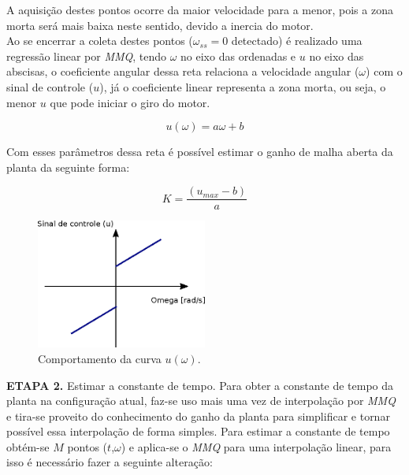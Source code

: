 
A aquisição destes pontos ocorre da maior velocidade para a menor, pois a zona morta será mais baixa neste sentido, devido a inercia do motor.\\

Ao se encerrar a coleta destes pontos ($\omega_{ss} = 0$ detectado) é realizado uma regressão linear por \textit{MMQ}, tendo $\omega$ no eixo das ordenadas e $u$ no eixo das abscisas, o coeficiente angular dessa reta relaciona a velocidade angular ($\omega$) com o sinal de controle ($u$), já o coeficiente linear representa a zona morta, ou seja, o menor $u$ que pode iniciar o giro do motor.

\begin{equation*}
    u(\omega) = a\omega + b
\end{equation*}

Com esses parâmetros dessa reta é possível estimar o ganho de malha aberta da planta da seguinte forma:

\begin{equation*}
    K = \frac{(u_{max} - b)}{a}
\end{equation*}
    
\begin{figure}[H]
    \centering
    \includegraphics[width=0.5\textwidth]{figuras/ilustracoes/omega_x_sinal_controle.eps}
    \caption{Comportamento da curva $u(\omega)$.}
    \label{fig:ilustracao_omega_x_pwm}
\end{figure}    
    
\textbf{ETAPA 2.} Estimar a constante de tempo. Para obter a constante de tempo da planta na configuração atual, faz-se uso mais uma vez de interpolação por \textit{MMQ} e tira-se proveito do conhecimento do ganho da planta para simplificar e tornar possível essa interpolação de forma simples. Para estimar a constante de tempo obtém-se $M$ pontos ($t$,$\omega$) e aplica-se o \textit{MMQ} para uma interpolação linear, para isso é necessário fazer a seguinte alteração:
    

